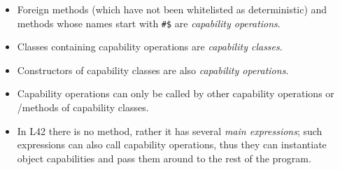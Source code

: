 \begin{itemize}
\item Foreign methods (which have not been whitelisted as deterministic) and methods whose names start with \texttt{\#\$} are \emph{capability operations}.
\item Classes containing capability operations are \emph{capability classes}.
\item Constructors of capability classes are also \emph{capability operations}.
\item Capability operations can only be called by other capability operations or \Q@mut@/\Q@capsule@ methods of capability classes.
\item In L42 there is no \Q@main@ method, rather it has several \emph{main expressions}; such expressions can also call capability operations, thus they can instantiate object capabilities and pass them around to the rest of the program.

\end{itemize}



